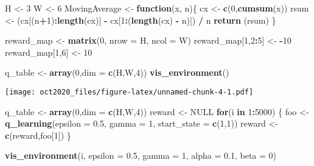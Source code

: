 \documentclass[
]{article}
\newenvironment{Shaded}{\begin{snugshade}}{\end{snugshade}}
\newcommand{\AttributeTok}[1]{\textcolor[rgb]{0.13,0.29,0.53}{#1}}
\newcommand{\ConstantTok}[1]{\textcolor[rgb]{0.56,0.35,0.01}{#1}}
\newcommand{\ControlFlowTok}[1]{\textcolor[rgb]{0.13,0.29,0.53}{\textbf{#1}}}
\newcommand{\DecValTok}[1]{\textcolor[rgb]{0.00,0.00,0.81}{#1}}
\newcommand{\FloatTok}[1]{\textcolor[rgb]{0.00,0.00,0.81}{#1}}
\newcommand{\FunctionTok}[1]{\textcolor[rgb]{0.13,0.29,0.53}{\textbf{#1}}}
\newcommand{\NormalTok}[1]{#1}
\newcommand{\OtherTok}[1]{\textcolor[rgb]{0.56,0.35,0.01}{#1}}
\newcommand{\SpecialCharTok}[1]{\textcolor[rgb]{0.81,0.36,0.00}{\textbf{#1}}}
\begin{document}
\begin{Shaded}
\begin{Highlighting}[]
\NormalTok{H }\OtherTok{\textless{}{-}} \DecValTok{3}
\NormalTok{W }\OtherTok{\textless{}{-}} \DecValTok{6}
\NormalTok{MovingAverage }\OtherTok{\textless{}{-}} \ControlFlowTok{function}\NormalTok{(x, n)\{}
\NormalTok{  cx }\OtherTok{\textless{}{-}} \FunctionTok{c}\NormalTok{(}\DecValTok{0}\NormalTok{,}\FunctionTok{cumsum}\NormalTok{(x))}
\NormalTok{  rsum }\OtherTok{\textless{}{-}}\NormalTok{ (cx[(n}\SpecialCharTok{+}\DecValTok{1}\NormalTok{)}\SpecialCharTok{:}\FunctionTok{length}\NormalTok{(cx)] }\SpecialCharTok{{-}}\NormalTok{ cx[}\DecValTok{1}\SpecialCharTok{:}\NormalTok{(}\FunctionTok{length}\NormalTok{(cx) }\SpecialCharTok{{-}}\NormalTok{ n)]) }\SpecialCharTok{/}\NormalTok{ n}
  \FunctionTok{return}\NormalTok{ (rsum)}
\NormalTok{\}}

\NormalTok{reward\_map }\OtherTok{\textless{}{-}} \FunctionTok{matrix}\NormalTok{(}\DecValTok{0}\NormalTok{, }\AttributeTok{nrow =}\NormalTok{ H, }\AttributeTok{ncol =}\NormalTok{ W)}
\NormalTok{reward\_map[}\DecValTok{1}\NormalTok{,}\DecValTok{2}\SpecialCharTok{:}\DecValTok{5}\NormalTok{] }\OtherTok{\textless{}{-}} \SpecialCharTok{{-}}\DecValTok{10}
\NormalTok{reward\_map[}\DecValTok{1}\NormalTok{,}\DecValTok{6}\NormalTok{] }\OtherTok{\textless{}{-}} \DecValTok{10}

\NormalTok{q\_table }\OtherTok{\textless{}{-}} \FunctionTok{array}\NormalTok{(}\DecValTok{0}\NormalTok{,}\AttributeTok{dim =} \FunctionTok{c}\NormalTok{(H,W,}\DecValTok{4}\NormalTok{))}
\FunctionTok{vis\_environment}\NormalTok{()}
\end{Highlighting}
\end{Shaded}

\texttt{[image: oct2020\_files/figure-latex/unnamed-chunk-4-1.pdf]}

\begin{Shaded}
\begin{Highlighting}[]
\NormalTok{q\_table }\OtherTok{\textless{}{-}} \FunctionTok{array}\NormalTok{(}\DecValTok{0}\NormalTok{,}\AttributeTok{dim =} \FunctionTok{c}\NormalTok{(H,W,}\DecValTok{4}\NormalTok{))}
\NormalTok{   reward }\OtherTok{\textless{}{-}} \ConstantTok{NULL}
  \ControlFlowTok{for}\NormalTok{(i }\ControlFlowTok{in} \DecValTok{1}\SpecialCharTok{:}\DecValTok{5000}\NormalTok{) \{}
\NormalTok{    foo }\OtherTok{\textless{}{-}} \FunctionTok{q\_learning}\NormalTok{(}\AttributeTok{epsilon =} \FloatTok{0.5}\NormalTok{, }\AttributeTok{gamma =} \DecValTok{1}\NormalTok{, }\AttributeTok{start\_state =} \FunctionTok{c}\NormalTok{(}\DecValTok{1}\NormalTok{,}\DecValTok{1}\NormalTok{))}
\NormalTok{    reward }\OtherTok{\textless{}{-}} \FunctionTok{c}\NormalTok{(reward,foo[}\DecValTok{1}\NormalTok{])}
\NormalTok{  \}}

\FunctionTok{vis\_environment}\NormalTok{(i, }\AttributeTok{epsilon =} \FloatTok{0.5}\NormalTok{, }\AttributeTok{gamma =} \DecValTok{1}\NormalTok{, }\AttributeTok{alpha =} \FloatTok{0.1}\NormalTok{, }\AttributeTok{beta =} \DecValTok{0}\NormalTok{)}
\end{Highlighting}
\end{Shaded}
\end{document}
